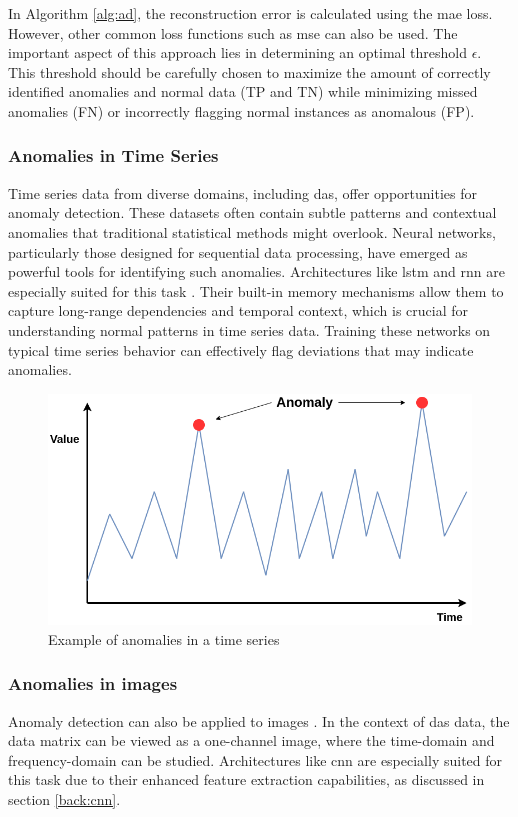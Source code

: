 In Algorithm \ref{alg:ad}, the reconstruction error is calculated using the \acrshort{mae} loss. However, other common loss functions such as \acrshort{mse} can also be used. The important aspect of this approach lies in determining an optimal threshold $\epsilon$. This threshold should be carefully chosen to maximize the amount of correctly identified anomalies and normal data (TP and TN) while minimizing missed anomalies (FN) or incorrectly flagging normal instances as anomalous (FP).


\subsubsection{Anomalies in Time Series}

Time series data from diverse domains, including \acrshort{das}, offer opportunities for anomaly detection. These datasets often contain subtle patterns and contextual anomalies that traditional statistical methods might overlook. Neural networks, particularly those designed for sequential data processing, have emerged as powerful tools for identifying such anomalies. Architectures like \acrfull{lstm} \cite{lstm} and \acrfull{rnn} \cite{medsker2001recurrent} are especially suited for this task \cite{wang2024deep, wei2022lstmautoencoder}. Their built-in memory mechanisms allow them to capture long-range dependencies and temporal context, which is crucial for understanding normal patterns in time series data. Training these networks on typical time series behavior can effectively flag deviations that may indicate anomalies. 

\begin{figure}[!h]
    \centering
    \includegraphics[scale=0.4]{figures/anolay_line.png}
    \caption{Example of anomalies in a time series}
    \label{fig:anomaly_example}
\end{figure}


\subsubsection{Anomalies in images}

Anomaly detection can also be applied to images \cite{beggel2020robust}. In the context of \acrshort{das} data, the data matrix can be viewed as a one-channel image, where the time-domain and frequency-domain can be studied. Architectures like \acrshort{cnn} are especially suited for this task due to their enhanced feature extraction capabilities, as discussed in section \ref{back:cnn}.


